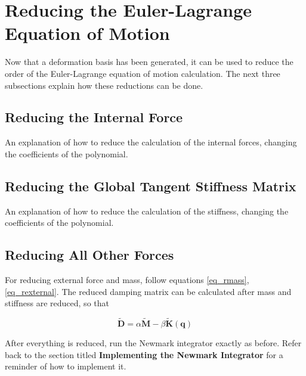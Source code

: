 \documentclass[twocolumn,10pt]{asme2ej}
\begin{document}
\section{Reducing the Euler-Lagrange Equation of Motion}

Now that a deformation basis has been generated, it can be used to reduce the order of the Euler-Lagrange equation of motion calculation. The next three subsections explain how these reductions can be done.  

\subsection{Reducing the Internal Force}

An explanation of how to reduce the calculation of the internal forces, changing the coefficients
of the polynomial.

\subsection{Reducing the Global Tangent Stiffness Matrix}

An explanation of how to reduce the calculation of the stiffness, changing the coefficients
of the polynomial.

\subsection{Reducing All Other Forces}

For reducing external force and mass, follow equations \ref{eq_rmass}, \ref{eq_rexternal}. The reduced damping matrix can be calculated after mass and stiffness are reduced, so that

\begin{equation}
  \bm{\tilde{D}} = \alpha\bm{\tilde{M}} - \beta\bm{\tilde{K}}(\bm{q})
\end{equation}

After everything is reduced, run the Newmark integrator exactly as before. Refer back to the section titled \textbf{Implementing the Newmark Integrator} for a reminder of how to implement it.

\end{document}
